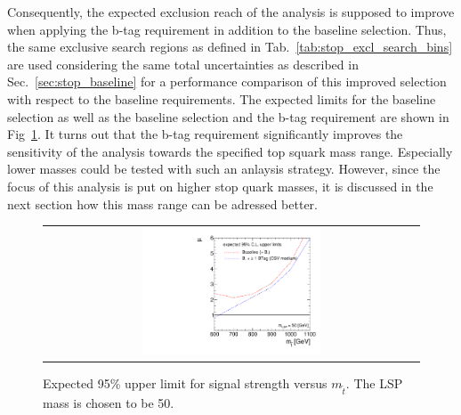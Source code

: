 Consequently, the expected exclusion reach of the analysis is supposed to improve when applying the b-tag requirement in addition to the baseline selection. Thus, the same exclusive search regions as defined in Tab.~\ref{tab:stop_excl_search_bins} are used considering the same total uncertainties as described in Sec.~\ref{sec:stop_baseline} for a performance comparison of this improved selection with respect to the baseline requirements. The expected limits for the baseline selection as well as the baseline selection and the b-tag requirement are shown in Fig~\ref{fig:stop_baselinebtag_limit}. It turns out that the b-tag requirement significantly improves the sensitivity of the analysis towards the specified top squark mass range. Especially lower masses could be tested with such an anlaysis strategy. However, since the focus of this analysis is put on higher stop quark masses, it is discussed in the next section how this mass range can be adressed better.  

\begin{figure}[!h]
  \centering
  \begin{tabular}{c}
                \includegraphics[width=0.49\textwidth]{figures/limitplot4BinSel_BaselineBTag.pdf} 
  \end{tabular}
  \caption{Expected 95\% upper limit for signal strength versus $m_{\tilde{t}}$. The LSP mass is chosen to be 50\gev.}
  \label{fig:stop_baselinebtag_limit}
\end{figure}

